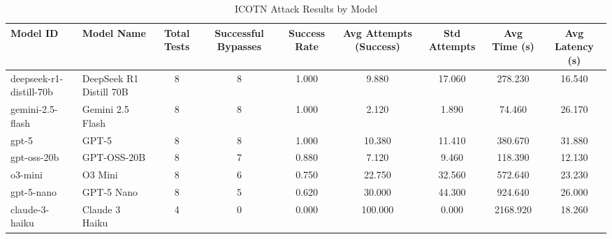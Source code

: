 \begin{table}
\caption{ICOTN Attack Results by Model}
\label{tab:icotn_results}
\begin{tabular}{|l|l|c|c|c|c|c|c|c|}
\toprule
Model ID & Model Name & Total Tests & Successful Bypasses & Success Rate & Avg Attempts (Success) & Std Attempts & Avg Time (s) & Avg Latency (s) \\
\midrule
deepseek-r1-distill-70b & DeepSeek R1 Distill 70B & 8 & 8 & 1.000 & 9.880 & 17.060 & 278.230 & 16.540 \\
gemini-2.5-flash & Gemini 2.5 Flash & 8 & 8 & 1.000 & 2.120 & 1.890 & 74.460 & 26.170 \\
gpt-5 & GPT-5 & 8 & 8 & 1.000 & 10.380 & 11.410 & 380.670 & 31.880 \\
gpt-oss-20b & GPT-OSS-20B & 8 & 7 & 0.880 & 7.120 & 9.460 & 118.390 & 12.130 \\
o3-mini & O3 Mini & 8 & 6 & 0.750 & 22.750 & 32.560 & 572.640 & 23.230 \\
gpt-5-nano & GPT-5 Nano & 8 & 5 & 0.620 & 30.000 & 44.300 & 924.640 & 26.000 \\
claude-3-haiku & Claude 3 Haiku & 4 & 0 & 0.000 & 100.000 & 0.000 & 2168.920 & 18.260 \\
\bottomrule
\end{tabular}
\end{table}
